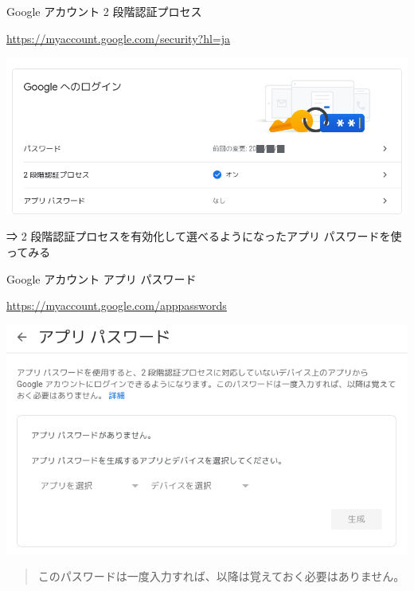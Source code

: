 \begin{frame}{Google アカウント 2 段階認証プロセス}

{\footnotesize\url{https://myaccount.google.com/security?hl=ja}}

\includegraphics[width=0.9\hsize]{image202205/g-security-signinopts-1.png}

\begin{quote}
\end{quote}

⇒ 2 段階認証プロセスを有効化して選べるようになったアプリ パスワードを使ってみる

\end{frame}

\begin{frame}{Google アカウント アプリ パスワード}

{\footnotesize\url{https://myaccount.google.com/apppasswords}}

\begin{center}
\includegraphics[width=0.8\hsize]{image202205/g-apppass-0-0.png}
\end{center}

\begin{quote}
このパスワードは一度入力すれば、以降は覚えておく必要はありません。
\end{quote}

\end{frame}

